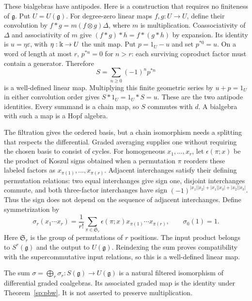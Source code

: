 These bialgebras have antipodes.  Here is a construction that requires
no finiteness of $\mathfrak g$.  Put $U=U(\mathfrak g)$.
For degree-zero linear maps $f,g:U\to U$, define
their convolution by $f*g=m(f\otimes g)\Delta$, where $m$ is
multiplication.  Coassociativity of $\Delta$ and associativity of $m$
give $(f*g)*h=f*(g*h)$ by expansion.
Its identity is $u=\eta\varepsilon$, with
$\eta:\Bbbk\to U$ the unit map. Put $p=1_U-u$ and set $p^{*0}=u$.  On a word of length at
most $r$, $p^{*n}=0$ for $n>r$: each surviving coproduct factor must
contain a generator.  Therefore
\[
 S=\sum_{n\geq0}(-1)^np^{*n}
\]
is a well-defined linear map.  Multiplying this finite geometric series
by $u+p=1_U$ in either convolution order gives $S*1_U=1_U*S=u$.
These are the two antipode identities.  Every summand is a chain map,
so $S$ commutes with $d$.  A bialgebra with such a map is a Hopf algebra.

The filtration gives the ordered basis, but a chain isomorphism needs
a splitting that respects the differential.  Graded averaging supplies
one without requiring the chosen basis to consist of cycles.
For homogeneous $x_1,\ldots,x_r$, let
$\epsilon(\pi;x)$ be the product of Koszul signs obtained when a
permutation $\pi$ reorders these labeled factors as
$x_{\pi(1)},\ldots,x_{\pi(r)}$.
Adjacent interchanges satisfy their defining permutation relations:
two equal interchanges give sign one, disjoint interchanges commute,
and both three-factor interchanges have sign
$(-1)^{|x_1||x_2|+|x_1||x_3|+|x_2||x_3|}$.
Thus the sign does not depend on the sequence of adjacent interchanges.
Define symmetrization by
\begin{equation}
 \sigma_r(x_1\cdots x_r)=\frac1{r!}
 \sum_{\pi\in\mathfrak S_r}\epsilon(\pi;x)
 x_{\pi(1)}\cdots x_{\pi(r)},\qquad \sigma_0(1)=1.
 \label{sp:symmetrization}
\end{equation}
Here $\mathfrak S_r$ is the group of permutations of $r$ positions.
The input product belongs to $S^r(\mathfrak g)$ and the output to
$U(\mathfrak g)$.  Reindexing the sum proves compatibility with the
supercommutative input relations, so this is a well-defined linear map.

\begin{proposition}
\label{sp:symmetrization-theorem}
The sum $\sigma=\bigoplus_r\sigma_r:S(\mathfrak g)\to U(\mathfrak g)$
is a natural filtered isomorphism of differential graded coalgebras.
Its associated graded map is the identity under Theorem~\ref{sp:pbw}.
It is not asserted to preserve multiplication.
\end{proposition}

